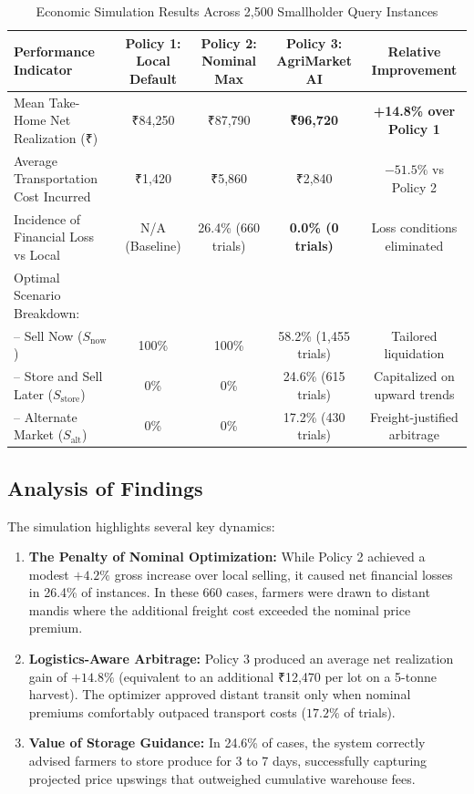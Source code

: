 \documentclass[conference]{IEEEtran}
\begin{document}
\begin{table}[htbp]
\caption{Economic Simulation Results Across 2,500 Smallholder Query Instances}
\begin{center}
\begin{tabular}{lcccc}
\toprule
\textbf{Performance Indicator} & \textbf{Policy 1: Local Default} & \textbf{Policy 2: Nominal Max} & \textbf{Policy 3: AgriMarket AI} & \textbf{Relative Improvement} \\
\midrule
Mean Take-Home Net Realization (₹)  & ₹84,250 & ₹87,790 & \textbf{₹96,720} & \textbf{+14.8\% over Policy 1} \\
Average Transportation Cost Incurred & ₹1,420 & ₹5,860 & ₹2,840 & $-51.5\%$ vs Policy 2 \\
Incidence of Financial Loss vs Local & N/A (Baseline) & 26.4\% (660 trials) & \textbf{0.0\% (0 trials)} & Loss conditions eliminated \\
Optimal Scenario Breakdown: & & & & \\
-- Sell Now ($S_{\text{now}}$) & 100\% & 100\% & 58.2\% (1,455 trials) & Tailored liquidation \\
-- Store and Sell Later ($S_{\text{store}}$) & 0\% & 0\% & 24.6\% (615 trials) & Capitalized on upward trends \\
-- Alternate Market ($S_{\text{alt}}$) & 0\% & 0\% & 17.2\% (430 trials) & Freight-justified arbitrage \\
\bottomrule
\end{tabular}
\label{tab:economic_simulation}
\end{center}
\end{table}

\subsection{Analysis of Findings}
The simulation highlights several key dynamics:
\begin{enumerate}
    \item \textbf{The Penalty of Nominal Optimization:} While Policy 2 achieved a modest $+4.2\%$ gross increase over local selling, it caused net financial losses in 26.4\% of instances. In these 660 cases, farmers were drawn to distant mandis where the additional freight cost exceeded the nominal price premium.
    \item \textbf{Logistics-Aware Arbitrage:} Policy 3 produced an average net realization gain of $+14.8\%$ (equivalent to an additional ₹12,470 per lot on a 5-tonne harvest). The optimizer approved distant transit only when nominal premiums comfortably outpaced transport costs ($17.2\%$ of trials).
    \item \textbf{Value of Storage Guidance:} In 24.6\% of cases, the system correctly advised farmers to store produce for 3 to 7 days, successfully capturing projected price upswings that outweighed cumulative warehouse fees.
\end{enumerate}
\end{document}
